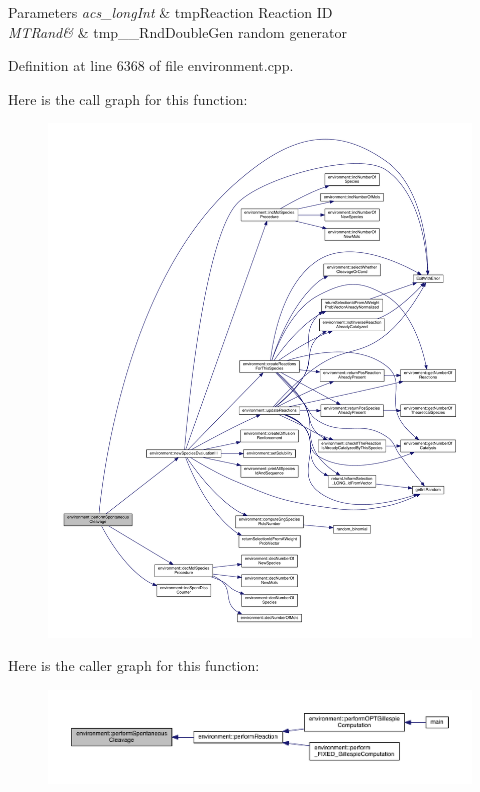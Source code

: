 \begin{DoxyParams}{Parameters}
{\em acs\-\_\-long\-Int} & tmp\-Reaction Reaction I\-D \\
\hline
{\em M\-T\-Rand\&} & tmp\-\_\-\-\_\-\-Rnd\-Double\-Gen random generator \\
\hline
\end{DoxyParams}


Definition at line 6368 of file environment.\-cpp.



Here is the call graph for this function\-:\nopagebreak
\begin{figure}[H]
\begin{center}
\leavevmode
\includegraphics[width=350pt]{a00014_a4949138a3771b7f6ec2bfe82cbad947e_cgraph}
\end{center}
\end{figure}




Here is the caller graph for this function\-:\nopagebreak
\begin{figure}[H]
\begin{center}
\leavevmode
\includegraphics[width=350pt]{a00014_a4949138a3771b7f6ec2bfe82cbad947e_icgraph}
\end{center}
\end{figure}


